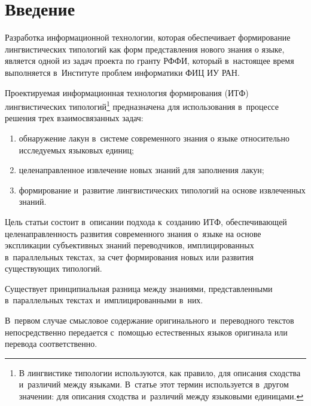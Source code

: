   
\vspace*{-4pt}



\thispagestyle{headings}

\begin{multicols}{2}

\label{st\stat}
   
\section{Введение}
    
  Разработка информационной технологии, которая обеспечивает 
формирование лингвистических типологий как форм представления нового 
знания о языке, является одной из задач проекта по гранту РФФИ, который 
в~настоящее время выполняется в~Институте проблем информатики ФИЦ ИУ 
РАН. 
{

}

Проектируемая информационная технология формирования (ИТФ) 
лингвистических типологий\footnote[2]{В лингвистике типологии используются, 
как правило, для описания сходства и~различий между языками. В~статье этот 
термин используется в~другом значении: для описания сходства и~различий 
между языковыми единицами.} предназначена для использования в~процессе 
решения трех взаимосвязанных задач: 
\begin{enumerate}[(1)]
\item обнаружение лакун в~сис\-те\-ме 
современного знания о языке относительно исследуемых языковых единиц; 
\item целенаправленное извлечение новых знаний для заполнения лакун; 
\item формирование и~развитие лингвистических типологий на основе 
извлеченных знаний.
\end{enumerate}
  
  Цель статьи состоит в~описании подхода к~созданию ИТФ, обеспечивающей 
целенаправленность развития современного знания о~языке на основе 
экспликации субъективных знаний переводчиков, имплицированных 
в~параллельных текстах, за счет формирования новых или развития 
существующих типологий. 

Существует принципиальная разница между 
знаниями, представленными в~параллельных текстах и~имплицированными 
в~них. 

В~первом случае смысловое содержание оригинального и~переводного 
текстов непосредственно передается с~помощью естественных языков 
оригинала или перевода соответственно. 


\end{multicols}
